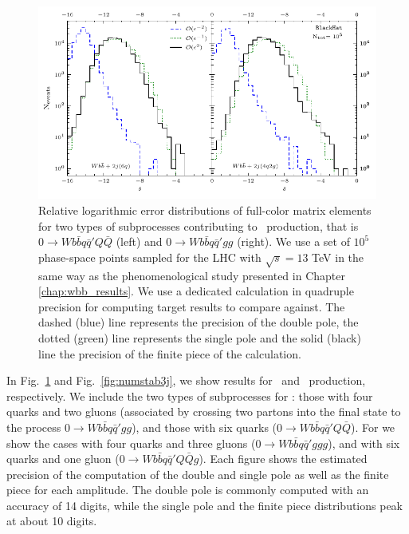\begin{figure}[tbh]
\begin{center}
\includegraphics[clip,scale=1.2]{plots/numstab2j}
\end{center}
\caption{Relative logarithmic error distributions of full-color
  matrix elements for two types of subprocesses contributing to
  \Wbbnj[2]~production, that is $0\rightarrow Wb{\bar b}q{\bar q}'Q{\bar
    Q}$ (left) and $0\rightarrow Wb{\bar b}q{\bar q}'gg$ (right). We use a set of $10^5$
phase-space points sampled for the LHC with $\sqrt{s}=13$ TeV in the same way as the phenomenological
study presented in Chapter \ref{chap:wbb_results}. We use a dedicated calculation in
quadruple precision for computing target results to compare against. The dashed (blue) line represents the precision of the double pole, the dotted
(green) line represents the single pole and the
solid (black) line the precision of the finite piece of the calculation.}
\label{fig:numstab2j}
\end{figure}

In Fig.~\ref{fig:numstab2j} and Fig.~\ref{fig:numstab3j}, we show
results for \Wbbnj[2]~and \Wbbnj[3]~production, respectively. We include the
two types of
subprocesses for \Wbbnj[2] : those with four quarks and two gluons (associated by crossing two
partons into the final state to the process $0\rightarrow Wb{\bar b}q{\bar q}'gg$),
and those with six quarks ($0\rightarrow Wb{\bar b}q{\bar q}'Q{\bar Q}$).
For \Wbbnj[3]{} we show the cases with four quarks and three gluons
($0\rightarrow Wb{\bar b}q{\bar q}'ggg$),
and with six quarks and one gluon ($0\rightarrow Wb{\bar b}q{\bar q}'Q{\bar Q}g$).
%
Each figure shows the estimated precision of the computation of the double and
single pole as well as the finite piece for each amplitude. The double pole is
commonly computed with an accuracy of 14 digits, while the single pole and the
finite piece distributions peak at about 10 digits.


